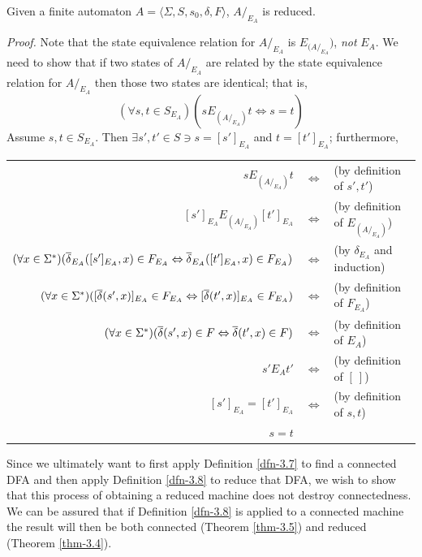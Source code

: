 \begin{thm}\label{thm-3.4}
Given a finite automaton $A =\langle\Sigma,S,s_0,\delta,F\rangle$, $A/_{E_A}$ is
reduced.

\emph{Proof.} Note that the state equivalence relation for $A/_{E_A}$ is
$E_{(A/  _{E_A}})$, \emph{not} $E_A$. We need to show that if two states of $A/_{E_A}$
are related by the state equivalence relation for $A/  _{E_A}$ then those two
states are identical; that is,
\[ (\forall s,t \in S_{E_A})(s E_{(A/ _{E_A})} t \Leftrightarrow s = t) \]
Assume $s,t \in S_{E_A}$. Then $\exists s',t' \in S \ni s = [s']_{E_A}$ and
$t = [t']_{E_A}$; furthermore,
\begin{center}
\begin{tabular}{rcl}
$s E_{(A/_{E_A})} t$ & $\Leftrightarrow$ & (by definition of $s',t'$) \\
$[s']_{E_A} E_{(A/_{E_A})} [t']_{E_A}$ & $\Leftrightarrow$ &
	(by definition of $E_{(A/_{E_A})}$) \\
$(\forall x \in \Sigma^*)(\overline{\delta}_{E_A}([s']_{E_A},x) \in F_{E_A} \Leftrightarrow
	\overline{\delta}_{E_A}([t']_{E_A},x) \in F_{E_A})$ & $\Leftrightarrow$ &
	(by $\delta_{E_A}$ and induction) \\
$(\forall x \in \Sigma^*)([\overline{\delta}(s',x)]_{E_A} \in F_{E_A} \Leftrightarrow
	[\overline{\delta}(t',x)]_{E_A} \in F_{E_A})$ & $\Leftrightarrow$ &
	(by definition of $F_{E_A}$) \\
$(\forall x \in \Sigma^*)(\overline{\delta}(s',x) \in F \Leftrightarrow \overline{\delta}(t',x) \in F)$
	& $\Leftrightarrow$ & (by definition of $E_A$) \\
$s' E_A t'$ & $\Leftrightarrow$ & (by definition of $[\ ]$) \\
$[s']_{E_A} = [t']_{E_A}$ & $\Leftrightarrow$ & (by definition of $s,t$) \\
$s = t$ &&
\end{tabular}
\end{center}
\end{thm}

Since we ultimately want to first apply Definition \ref{dfn-3.7} to find a connected DFA
and then apply Definition \ref{dfn-3.8} to reduce that DFA, we wish to show that this
process of obtaining a reduced machine does not destroy connectedness. We can be
assured that if Definition \ref{dfn-3.8} is applied to a connected machine the result will
then be both connected (Theorem \ref{thm-3.5}) and reduced (Theorem \ref{thm-3.4}).

